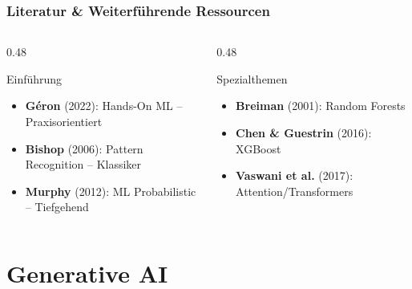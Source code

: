 \documentclass[11pt, aspectratio=169]{beamer}
\begin{document}
\begin{frame}[allowframebreaks]
    \frametitle{Literatur \& Weiterführende Ressourcen}
    \begin{columns}[t]
        \begin{column}{0.48\textwidth}
            \begin{block}{Einführung}
                \begin{itemize}
                    \item \textbf{Géron} (2022): Hands-On ML -- Praxisorientiert
                    \item \textbf{Bishop} (2006): Pattern Recognition -- Klassiker
                    \item \textbf{Murphy} (2012): ML Probabilistic -- Tiefgehend
                \end{itemize}
            \end{block}
        \end{column}
        \begin{column}{0.48\textwidth}
            \begin{block}{Spezialthemen}
                \begin{itemize}
                    \item \textbf{Breiman} (2001): Random Forests
                    \item \textbf{Chen \& Guestrin} (2016): XGBoost
                    \item \textbf{Vaswani et al.} (2017): Attention/Transformers
                \end{itemize}
            \end{block}
        \end{column}
    \end{columns}
    \vspace{0.3cm}
    \printbibliography[heading=none]
\end{frame}

\appendix
\section{Generative AI}
\end{document}
